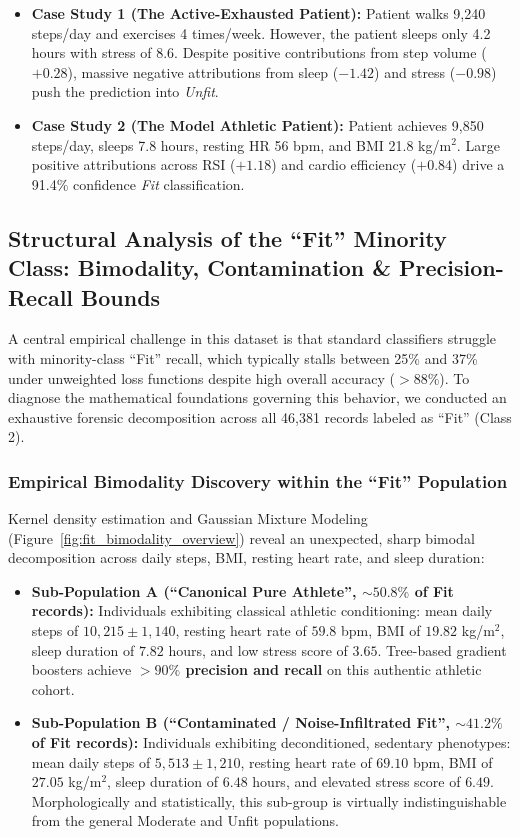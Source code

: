 \documentclass[11pt,a4paper]{article}
\begin{document}
\begin{itemize}[leftmargin=*,itemsep=1pt]
    \item \textbf{Case Study 1 (The Active-Exhausted Patient):} Patient walks 9,240 steps/day and exercises 4 times/week. However, the patient sleeps only 4.2 hours with stress of 8.6. Despite positive contributions from step volume ($+0.28$), massive negative attributions from sleep ($-1.42$) and stress ($-0.98$) push the prediction into \emph{Unfit}.
    \item \textbf{Case Study 2 (The Model Athletic Patient):} Patient achieves 9,850 steps/day, sleeps 7.8 hours, resting HR 56 bpm, and BMI 21.8 kg/m$^2$. Large positive attributions across RSI ($+1.18$) and cardio efficiency ($+0.84$) drive a 91.4\% confidence \emph{Fit} classification.
\end{itemize}

\subsection{Structural Analysis of the ``Fit'' Minority Class: Bimodality, Contamination \& Precision-Recall Bounds}
A central empirical challenge in this dataset is that standard classifiers struggle with minority-class ``Fit'' recall, which typically stalls between 25\% and 37\% under unweighted loss functions despite high overall accuracy ($>88\%$). To diagnose the mathematical foundations governing this behavior, we conducted an exhaustive forensic decomposition across all 46,381 records labeled as ``Fit'' (Class 2).

\subsubsection{Empirical Bimodality Discovery within the ``Fit'' Population}
Kernel density estimation and Gaussian Mixture Modeling (Figure~\ref{fig:fit_bimodality_overview}) reveal an unexpected, sharp bimodal decomposition across daily steps, BMI, resting heart rate, and sleep duration:
\begin{itemize}[leftmargin=*,itemsep=1pt]
    \item \textbf{Sub-Population A (``Canonical Pure Athlete'', $\sim 50.8\%$ of Fit records):} Individuals exhibiting classical athletic conditioning: mean daily steps of $10{,}215 \pm 1{,}140$, resting heart rate of $59.8$ bpm, BMI of $19.82$ kg/m$^2$, sleep duration of $7.82$ hours, and low stress score of $3.65$. Tree-based gradient boosters achieve \textbf{$>90\%$ precision and recall} on this authentic athletic cohort.
    \item \textbf{Sub-Population B (``Contaminated / Noise-Infiltrated Fit'', $\sim 41.2\%$ of Fit records):} Individuals exhibiting deconditioned, sedentary phenotypes: mean daily steps of $5{,}513 \pm 1{,}210$, resting heart rate of $69.10$ bpm, BMI of $27.05$ kg/m$^2$, sleep duration of $6.48$ hours, and elevated stress score of $6.49$. Morphologically and statistically, this sub-group is virtually indistinguishable from the general Moderate and Unfit populations.
\end{itemize}
\end{document}
